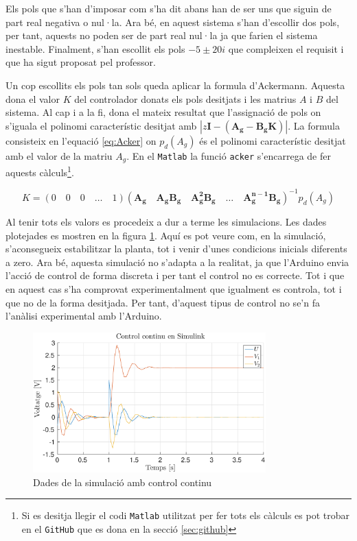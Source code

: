 \documentclass[12pt,a4paper,final,twoside,openright]{report}
\begin{document}
Els pols que s'han d'imposar com s'ha dit abans han de ser uns que siguin de part real negativa o nul·la. Ara bé, en aquest sistema s'han d'escollir dos pols, per tant, aquests no poden ser de part real nul·la ja que farien el sistema inestable. Finalment, s'han escollit els pols $-5\pm20i$ que compleixen el requisit i que ha sigut proposat pel professor. 

Un cop escollits els pols tan sols queda aplicar la formula d'Ackermann. Aquesta dona el valor $K$ del controlador donats els pols desitjats i les matrius $A$ i $B$ del sistema. Al cap i a la fi, dona el mateix resultat que l'assignació de pols on s'iguala el polinomi característic desitjat amb $|z \mathbf{I} - (\mathbf{A_g} - \mathbf{B_g K})|$. La formula consisteix en l'equació \eqref{eq:Acker} on $p_d(A_g)$ és el polinomi característic desitjat amb el valor de la matriu $A_g$. En el \texttt{Matlab} la funció \texttt{acker} s'encarrega de fer aquests càlculs\footnote{Si es desitja llegir el codi \texttt{Matlab} utilitzat per fer tots els càlculs es pot trobar en el \texttt{GitHub} que es dona en la secció \ref{sec:github}}.

\vspace{-10pt}
\begin{equation}\label{eq:Acker}
K=(0\quad0\quad0\quad\dots\quad1)(\mathbf{A_g}\quad \mathbf{A_g B_g}\quad \mathbf{A_g^2 B_g}\quad \dots\quad \mathbf{A_g^{n-1} B_g})^{-1} p_d(A_g)
\end{equation}

Al tenir tots els valors es procedeix a dur a terme les simulacions. Les dades plotejades es mostren en la figura \ref{fig:cont_sim}. Aquí es pot veure com, en la simulació, s'aconsegueix estabilitzar la planta, tot i venir d'unes condicions inicials diferents a zero. Ara bé, aquesta simulació no s'adapta a la realitat, ja que l'Arduino envia l'acció de control de forma discreta i per tant el control no es correcte. Tot i que en aquest cas s'ha comprovat experimentalment que igualment es controla, tot i que no de la forma desitjada. Per tant, d'aquest tipus de control no se'n fa l'anàlisi experimental amb l'Arduino. 

\begin{figure}
\centering
\includegraphics[width=0.8\textwidth]{Imatges/cont_sim.eps}
\caption{Dades de la simulació amb control continu\label{fig:cont_sim}}
\end{figure}
\end{document}
